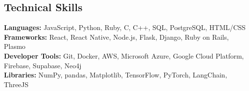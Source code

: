 \documentclass[letterpaper,11pt]{article}
\begin{document}
\begin{justify}
\section{Technical Skills}
 \begin{itemize}[leftmargin=0.15in, label={}]
    \small{\item{
     \textbf{Languages: }{JavaScript, Python, Ruby, C, C++, SQL, PostgreSQL, HTML/CSS} \\
     \textbf{Frameworks: }{React, React Native, Node.js, Flask, Django, Ruby on Rails, Plasmo} \\
     \textbf{Developer Tools: }{Git, Docker, AWS, Microsoft Azure, Google Cloud Platform, Firebase, Supabase, Neo4j} \\
     \textbf{Libraries: }{NumPy, pandas, Matplotlib, TensorFlow, PyTorch, LangChain, ThreeJS}
    }}
 \end{itemize}


\end{justify}
\end{document}
